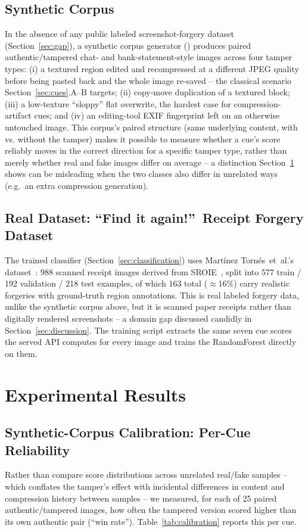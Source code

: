 \documentclass[conference]{IEEEtran}
\newcommand{\code}[1]{\path{#1}}
\begin{document}
\subsection{Synthetic Corpus}
In the absence of any public labeled screenshot-forgery dataset
(Section~\ref{sec:gap}), a synthetic corpus generator
(\code{tools/calibrate.py}) produces paired authentic/tampered chat- and
bank-statement-style images across four tamper types: (i) a textured region
edited and recompressed at a different JPEG quality before being pasted back
and the whole image re-saved -- the classical scenario
Section~\ref{sec:cues}.A--B targets; (ii) copy-move duplication of a textured
block; (iii) a low-texture ``sloppy'' flat overwrite, the hardest case for
compression-artifact cues; and (iv) an editing-tool EXIF fingerprint left on
an otherwise untouched image. This corpus's paired structure (same
underlying content, with vs. without the tamper) makes it possible to
measure whether a cue's score reliably moves in the correct direction for a
specific tamper type, rather than merely whether real and fake images differ
on average -- a distinction Section~\ref{sec:results} shows can be misleading
when the two classes also differ in unrelated ways (e.g.\ an extra
compression generation).

\subsection{Real Dataset: ``Find it again!''~Receipt Forgery Dataset}
The trained classifier (Section~\ref{sec:classification}) uses Mart\'{i}nez
Torn\'{e}s~et~al.'s dataset~\cite{martineztornes2023receipt}: 988 scanned
receipt images derived from SROIE~\cite{huang2019icdar}, split into 577
train / 192 validation / 218 test examples, of which 163 total ($\approx$16\%)
carry realistic forgeries with ground-truth region annotations. This is real
labeled forgery data, unlike the synthetic corpus above, but it is scanned
paper receipts rather than digitally rendered screenshots -- a domain gap
discussed candidly in Section~\ref{sec:discussion}. The training script
extracts the same seven cue scores the served API computes for every image
and trains the RandomForest directly on them.

\section{Experimental Results}
\label{sec:results}

\subsection{Synthetic-Corpus Calibration: Per-Cue Reliability}
Rather than compare score distributions across unrelated real/fake samples --
which conflates the tamper's effect with incidental differences in content
and compression history between samples -- we measured, for each of 25
paired authentic/tampered images, how often the tampered version scored
higher than its own authentic pair (``win rate''). Table~\ref{tab:calibration}
reports this per cue.
\end{document}
